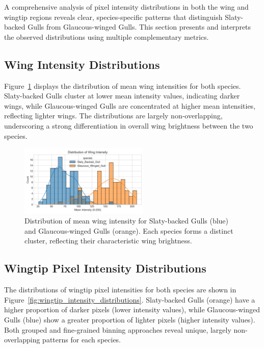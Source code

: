 \documentclass[a4paper,12pt]{report}
\begin{document}
A comprehensive analysis of pixel intensity distributions in both the wing and wingtip regions reveals clear, species-specific patterns that distinguish Slaty-backed Gulls from Glaucous-winged Gulls. This section presents and interprets the observed distributions using multiple complementary metrics.

\subsection{Wing Intensity Distributions}

Figure~\ref{fig:wing_intensity_distribution} displays the distribution of mean wing intensities for both species. Slaty-backed Gulls cluster at lower mean intensity values, indicating darker wings, while Glaucous-winged Gulls are concentrated at higher mean intensities, reflecting lighter wings. The distributions are largely non-overlapping, underscoring a strong differentiation in overall wing brightness between the two species.

\begin{figure}[H]
    \centering
    \includegraphics[width=0.55\textwidth]{images/REPORT_IMAGES_INTENSITY/I2/distribution.png}
    \caption{Distribution of mean wing intensity for Slaty-backed Gulls (blue) and Glaucous-winged Gulls (orange). Each species forms a distinct cluster, reflecting their characteristic wing brightness.}
    \label{fig:wing_intensity_distribution}
\end{figure}


\subsection{Wingtip Pixel Intensity Distributions}

The distributions of wingtip pixel intensities for both species are shown in Figure~\ref{fig:wingtip_intensity_distributions}. Slaty-backed Gulls (orange) have a higher proportion of darker pixels (lower intensity values), while Glaucous-winged Gulls (blue) show a greater proportion of lighter pixels (higher intensity values). Both grouped and fine-grained binning approaches reveal unique, largely non-overlapping patterns for each species.
\end{document}

